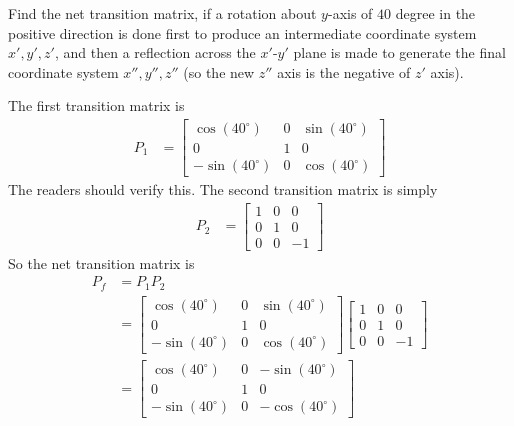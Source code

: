 \begin{exmp}
Find the net transition matrix, if a rotation about $y$-axis of $40$ degree in the positive direction is done first to produce an intermediate coordinate system $x', y', z'$, and then a reflection across the $x'$-$y'$ plane is made to generate the final coordinate system $x'', y'', z''$ (so the new $z''$ axis is the negative of $z'$ axis).
\end{exmp}
\begin{solution}
The first transition matrix is
\begin{align*}
P_1
&= 
\begin{bmatrix}
\cos(40^\circ) & 0 & \sin(40^\circ) \\
0 & 1 & 0 \\
-\sin(40^\circ) & 0 & \cos(40^\circ)
\end{bmatrix}
\end{align*}
The readers should verify this. The second transition matrix is simply
\begin{align*}
P_2
&= 
\begin{bmatrix}
1 & 0 & 0 \\
0 & 1 & 0 \\
0 & 0 & -1
\end{bmatrix}    
\end{align*}
So the net transition matrix is
\begin{align*}
P_f &= P_1P_2 \\
&= 
\begin{bmatrix}
\cos(40^\circ) & 0 & \sin(40^\circ) \\
0 & 1 & 0 \\
-\sin(40^\circ) & 0 & \cos(40^\circ)
\end{bmatrix}
\begin{bmatrix}
1 & 0 & 0 \\
0 & 1 & 0 \\
0 & 0 & -1
\end{bmatrix} \\
&= 
\begin{bmatrix}
\cos(40^\circ) & 0 & -\sin(40^\circ) \\
0 & 1 & 0 \\
-\sin(40^\circ) & 0 & -\cos(40^\circ)
\end{bmatrix}
\end{align*}
\end{solution}
